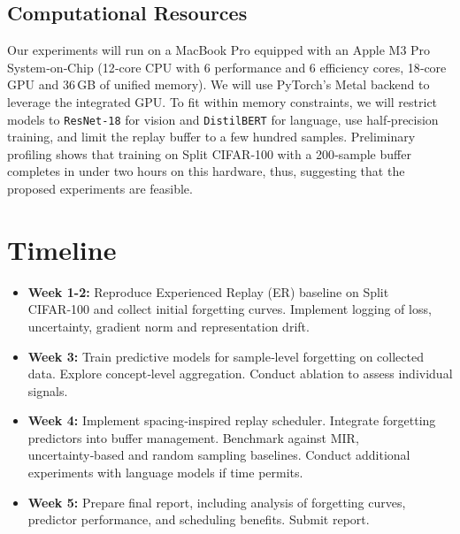 \documentclass{article}
\begin{document}
\subsection{Computational Resources}
Our experiments will run on a MacBook Pro equipped with an Apple M3 Pro System\mbox{‑}on\mbox{‑}Chip (12\mbox{‑}core CPU with 6 performance and 6 efficiency cores, 18\mbox{‑}core GPU and 36\,GB of unified memory).  We will use PyTorch's Metal backend to leverage the integrated GPU.  To fit within memory constraints, we will restrict models to \texttt{ResNet\mbox{‑}18} for vision and \texttt{DistilBERT} for language, use half\mbox{‑}precision training, and limit the replay buffer to a few hundred samples.  Preliminary profiling shows that training on Split CIFAR\mbox{‑}100 with a 200\mbox{‑}sample buffer completes in under two hours on this hardware, thus, suggesting that the proposed experiments are feasible.

\section{Timeline}
\begin{itemize}
    \item \textbf{Week 1-2:} Reproduce Experienced Replay (ER) baseline on Split CIFAR\mbox{‑}100 and collect initial forgetting curves.  Implement logging of loss, uncertainty, gradient norm and representation drift.
    \item \textbf{Week 3:} Train predictive models for sample\mbox{‑}level forgetting on collected data.  Explore concept\mbox{‑}level aggregation.  Conduct ablation to assess individual signals.
    \item \textbf{Week 4:} Implement spacing\mbox{‑}inspired replay scheduler.  Integrate forgetting predictors into buffer management.  Benchmark against MIR, uncertainty\mbox{‑}based and random sampling baselines. Conduct additional experiments with language models if time permits.
    \item \textbf{Week 5:} Prepare final report, including analysis of forgetting curves, predictor performance, and scheduling benefits.  Submit report.
\end{itemize}

{\small


}
\end{document}
